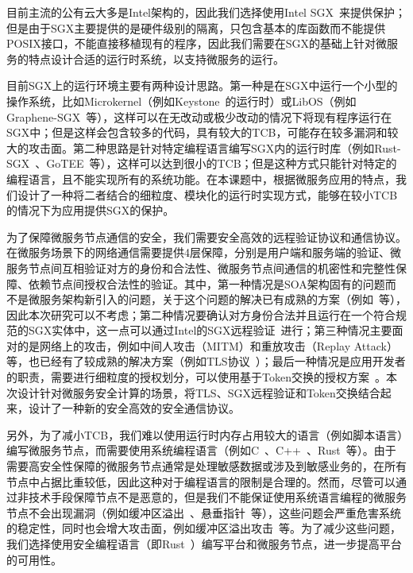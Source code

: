 目前主流的公有云大多是Intel架构的，因此我们选择使用Intel SGX~\cite{}来提供保护；但是由于SGX主要提供的是硬件级别的隔离，只包含基本的库函数而不能提供POSIX接口，不能直接移植现有的程序，因此我们需要在SGX的基础上针对微服务的特点设计合适的运行时系统，以支持微服务的运行。

目前SGX上的运行环境主要有两种设计思路。第一种是在SGX中运行一个小型的操作系统，比如Microkernel（例如Keystone~\cite{}的运行时）或LibOS（例如Graphene-SGX~\cite{}等），这样可以在无改动或极少改动的情况下将现有程序运行在SGX中；但是这样会包含较多的代码，具有较大的TCB，可能存在较多漏洞和较大的攻击面。第二种思路是针对特定编程语言编写SGX内的运行时库（例如Rust-SGX~\cite{}、GoTEE~\cite{}等），这样可以达到很小的TCB；但是这种方式只能针对特定的编程语言，且不能实现所有的系统功能。在本课题中，根据微服务应用的特点，我们设计了一种将二者结合的细粒度、模块化的运行时实现方式，能够在较小TCB的情况下为应用提供SGX的保护。

为了保障微服务节点通信的安全，我们需要安全高效的远程验证协议和通信协议。在微服务场景下的网络通信需要提供4层保障，分别是用户端和服务端的验证、微服务节点间互相验证对方的身份和合法性、微服务节点间通信的机密性和完整性保障、依赖节点间授权合法性的验证。其中，第一种情况是SOA架构固有的问题而不是微服务架构新引入的问题，关于这个问题的解决已有成熟的方案（例如~\cite{}等），因此本次研究可以不考虑；第二种情况要确认对方身份合法并且运行在一个符合规范的SGX实体中，这一点可以通过Intel的SGX远程验证~\cite{}进行；第三种情况主要面对的是网络上的攻击，例如中间人攻击（MITM）和重放攻击（Replay Attack）等，也已经有了较成熟的解决方案（例如TLS协议~\cite{}）；最后一种情况是应用开发者的职责，需要进行细粒度的授权划分，可以使用基于Token交换的授权方案~\cite{}。本次设计针对微服务安全计算的场景，将TLS、SGX远程验证和Token交换结合起来，设计了一种新的安全高效的安全通信协议。

另外，为了减小TCB，我们难以使用运行时内存占用较大的语言（例如脚本语言）编写微服务节点，而需要使用系统编程语言（例如C~\cite{}、C++~\cite{}、Rust~\cite{}等）。由于需要高安全性保障的微服务节点通常是处理敏感数据或涉及到敏感业务的，在所有节点中占据比重较低，因此这种对于编程语言的限制是合理的。然而，尽管可以通过非技术手段保障节点不是恶意的，但是我们不能保证使用系统语言编程的微服务节点不会出现漏洞（例如缓冲区溢出~\cite{}、悬垂指针~\cite{}等），这些问题会严重危害系统的稳定性，同时也会增大攻击面，例如缓冲区溢出攻击~\cite{}等。为了减少这些问题，我们选择使用安全编程语言（即Rust~\cite{}）编写平台和微服务节点，进一步提高平台的可用性。

